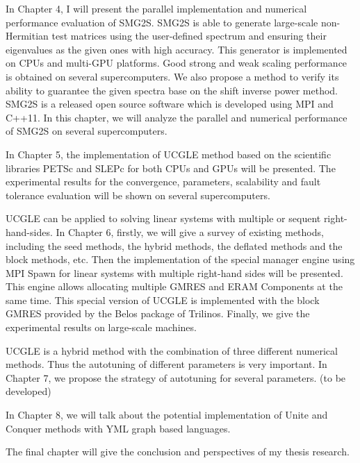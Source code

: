 In Chapter 4, I will present the parallel implementation and numerical performance evaluation of SMG2S.  SMG2S is able to generate large-scale non-Hermitian test matrices using the user-defined spectrum and ensuring their eigenvalues as the given ones with high accuracy. This generator is implemented on CPUs and multi-GPU platforms. Good strong and weak scaling performance is obtained on several supercomputers. We also propose a method to verify its ability to guarantee the given spectra base on the shift inverse power method. SMG2S is a released open source software which is developed using MPI and C++11. In this chapter, we will analyze the parallel and numerical performance of SMG2S on several supercomputers.

In Chapter 5, the implementation of UCGLE method based on the scientific libraries PETSc and SLEPc for both CPUs and GPUs will be presented. The experimental results for the convergence, parameters, scalability and fault tolerance evaluation will be shown on several supercomputers.

UCGLE can be applied to solving linear systems with multiple or sequent right-hand-sides. In Chapter 6, firstly, we will give a survey of existing methods, including the seed methods, the hybrid methods, the deflated methods and the block methods, etc. Then the implementation of the special manager engine using MPI Spawn for linear systems with multiple right-hand sides will be presented. This engine allows allocating multiple GMRES and ERAM Components at the same time. This special version of UCGLE is implemented with the block GMRES provided by the Belos package of Trilinos. Finally, we give the experimental results on large-scale machines.

UCGLE is a hybrid method with the combination of three different numerical methods. Thus the autotuning of different parameters is very important. In Chapter 7, we propose the strategy of autotuning for several parameters. (to be developed)

In Chapter 8, we will talk about the potential implementation of Unite and Conquer methods with YML graph based languages. 

The final chapter will give the conclusion and perspectives of my thesis research.